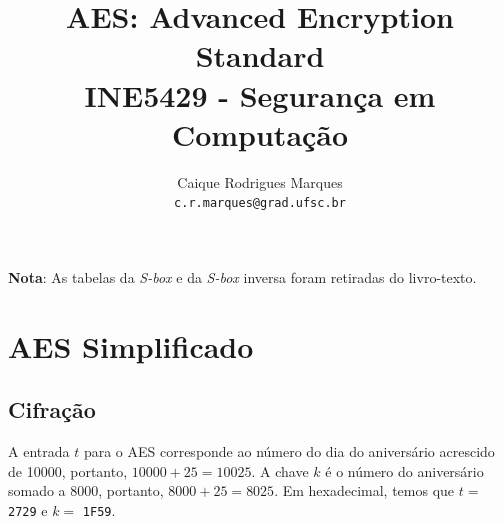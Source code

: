 \documentclass{article}
\title{\textbf{AES: Advanced Encryption Standard \\
        \large INE5429 - Segurança em Computação}}
\author{
    Caique Rodrigues Marques \\
    {\texttt{c.r.marques@grad.ufsc.br}}
}
\date{}
\begin{document}
\maketitle

\textbf{Nota}: As tabelas da \textit{S-box} e da \textit{S-box} inversa foram
retiradas do livro-texto\cite{stallings2014}.

\section{AES Simplificado}
\subsection{Cifração}
A entrada $t$ para o AES corresponde ao número do dia do aniversário acrescido
de 10000, portanto, $10000 + 25 = 10025$. A chave $k$ é o número do aniversário
somado a 8000, portanto, $8000 + 25 = 8025$. Em hexadecimal, temos que $t =$
\texttt{2729} e $k =$ \texttt{1F59}.
\end{document}
